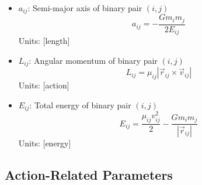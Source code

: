 \documentclass{article}
\begin{document}
\begin{itemize}
\item $a_{ij}$: Semi-major axis of binary pair $(i,j)$
    \begin{equation}
    a_{ij} = -\frac{G m_i m_j}{2E_{ij}}
    \end{equation}
    Units: [length]
    
\item $L_{ij}$: Angular momentum of binary pair $(i,j)$
    \begin{equation}
    L_{ij} = \mu_{ij} |\vec{r}_{ij} \times \vec{v}_{ij}|
    \end{equation}
    Units: [action]
    
\item $E_{ij}$: Total energy of binary pair $(i,j)$
    \begin{equation}
    E_{ij} = \frac{\mu_{ij}v_{ij}^2}{2} - \frac{G m_i m_j}{|\vec{r}_{ij}|}
    \end{equation}
    Units: [energy]
\end{itemize}

\subsection{Action-Related Parameters}
\end{document}
